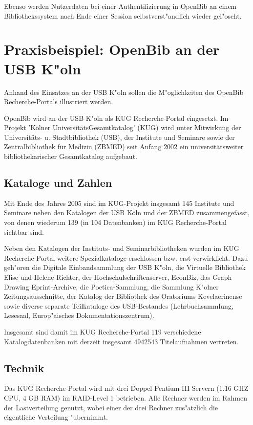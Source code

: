 \documentclass[11pt, twoside, a4paper, BCOR8mm, DIV12, bibtotoc,idxtotoc]{scrbook}
\begin{document}
\begin{itemize}
Ebenso werden Nutzerdaten bei einer Authentifizierung in OpenBib an
einem Bibliothekssystem nach Ende einer Session selbstverst"andlich
wieder gel"oscht.

\chapter{Praxisbeispiel: OpenBib an der USB K"oln}
Anhand des Einsatzes an der USB K"oln sollen die M"oglichkeiten des
OpenBib Recherche-Portals illustriert werden.

OpenBib wird an der USB K"oln als KUG Recherche-Portal eingesetzt. Im
Projekt 'Kölner UniversitätsGesamtkatalog' (KUG) wird unter Mitwirkung
der Universitäts- u. Stadtbibliothek (USB), der Institute und Seminare
sowie der Zentralbibliothek für Medizin (ZBMED) seit Anfang 2002 ein
universitätsweiter bibliothekarischer Gesamtkatalog aufgebaut.

\section{Kataloge und Zahlen}
Mit Ende des Jahres 2005 sind im KUG-Projekt insgesamt 145 Institute
und Seminare neben den Katalogen der USB Köln und der ZBMED
zusammengefasst, von denen wiederum 139 (in 104 Datenbanken) im KUG
Recherche-Portal sichtbar sind. 

Neben den Katalogen der Instituts- und Seminarbibliotheken wurden im
KUG Recherche-Portal weitere Spezialkataloge
erschlossen bzw. erst verwirklicht. Dazu geh"oren die Digitale
Einbandsammlung der USB K"oln, die Virtuelle Bibliothek Elise und
Helene Richter, der Hochschulschriftenserver, EconBiz, das Graph
Drawing Eprint-Archive, die Poetica-Sammlung, die Sammlung K"olner
Zeitungsausschnitte, der Katalog der  Bibliothek des Oratoriums
Kevelaerinense sowie diverse separate Teilkataloge des USB-Bestandes
(Lehrbuchsammlung, Lesesaal, Europ"aisches Dokumentationszentrum).

Insgesamt sind damit im KUG Recherche-Portal 119 verschiedene
Katalogdatenbanken mit derzeit insgesamt 4942543 Titelaufnahmen
vertreten.

\section{Technik}
Das KUG Recherche-Portal wird mit drei Doppel-Pentium-III Servern
(1.16 GHZ CPU, 4 GB RAM) im RAID-Level 1 betrieben. Alle Rechner
werden im Rahmen der Lastverteilung genutzt, wobei einer der drei
Rechner zus"atzlich die eigentliche Verteilung "ubernimmt.


\end{itemize}
\end{document}
